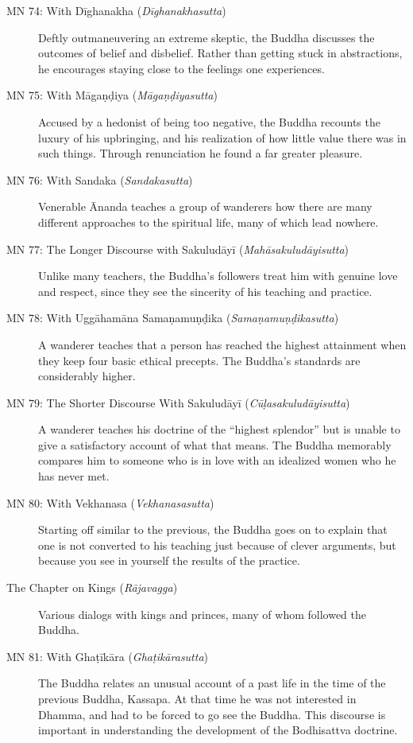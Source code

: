 \documentclass[12pt,openany]{book}%
\begin{document}
\begin{description}
\item[MN 74: With \textsanskrit{Dīghanakha} (\textit{\textsanskrit{Dīghanakhasutta}})] Deftly outmaneuvering an extreme skeptic, the Buddha discusses the outcomes of belief and disbelief. Rather than getting stuck in abstractions, he encourages staying close to the feelings one experiences.%
\item[MN 75: With \textsanskrit{Māgaṇḍiya} (\textit{\textsanskrit{Māgaṇḍiyasutta}})] Accused by a hedonist of being too negative, the Buddha recounts the luxury of his upbringing, and his realization of how little value there was in such things. Through renunciation he found a far greater pleasure.%
\item[MN 76: With Sandaka (\textit{\textsanskrit{Sandakasutta}})] Venerable Ānanda teaches a group of wanderers how there are many different approaches to the spiritual life, many of which lead nowhere.%
\item[MN 77: The Longer Discourse with \textsanskrit{Sakuludāyī} (\textit{\textsanskrit{Mahāsakuludāyisutta}})] Unlike many teachers, the Buddha’s followers treat him with genuine love and respect, since they see the sincerity of his teaching and practice.%
\item[MN 78: With \textsanskrit{Uggāhamāna} \textsanskrit{Samaṇamuṇḍika} (\textit{\textsanskrit{Samaṇamuṇḍikasutta}})] A wanderer teaches that a person has reached the highest attainment when they keep four basic ethical precepts. The Buddha’s standards are considerably higher.%
\item[MN 79: The Shorter Discourse With \textsanskrit{Sakuludāyī} (\textit{\textsanskrit{Cūḷasakuludāyisutta}})] A wanderer teaches his doctrine of the “highest splendor” but is unable to give a satisfactory account of what that means. The Buddha memorably compares him to someone who is in love with an idealized women who he has never met.%
\item[MN 80: With Vekhanasa (\textit{\textsanskrit{Vekhanasasutta}})] Starting off similar to the previous, the Buddha goes on to explain that one is not converted to his teaching just because of clever arguments, but because you see in yourself the results of the practice.%
\item[The Chapter on Kings (\textit{\textsanskrit{Rājavagga}})] Various dialogs with kings and princes, many of whom followed the Buddha.%
\item[MN 81: With \textsanskrit{Ghaṭīkāra} (\textit{\textsanskrit{Ghaṭikārasutta}})] The Buddha relates an unusual account of a past life in the time of the previous Buddha, Kassapa. At that time he was not interested in Dhamma, and had to be forced to go see the Buddha. This discourse is important in understanding the development of the Bodhisattva doctrine.%

\end{description}
\end{document}
